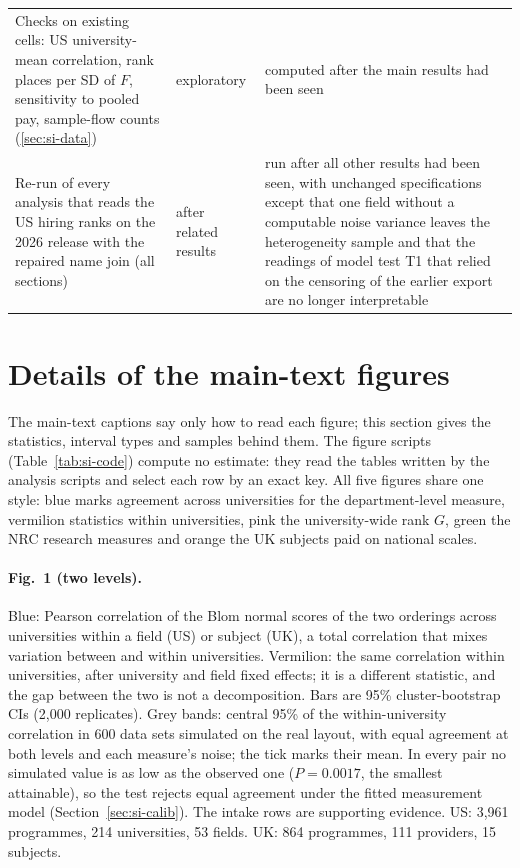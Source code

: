 \documentclass[11pt]{article}
\begin{document}
\begin{longtable}{@{}>{\raggedright\arraybackslash}p{5.6cm}>{\raggedright\arraybackslash}p{2.0cm}>{\raggedright\arraybackslash}p{8.2cm}@{}}
Checks on existing cells: US university-mean correlation, rank places per SD of $F$, sensitivity to pooled pay, sample-flow
counts (\ref{sec:si-data}) & exploratory & computed after the main results had been seen \\
Re-run of every analysis that reads the US hiring ranks on the 2026 release with the repaired name join (all
sections) & after related results & run after all other results had been seen, with unchanged specifications
except that one field without a computable noise variance leaves the heterogeneity sample and that the readings of
model test T1 that relied on the censoring of the earlier export are no longer interpretable \\
\end{longtable}
\endgroup

\section{Details of the main-text figures}\label{sec:si-figs}

The main-text captions say only how to read each figure; this section gives the statistics, interval types and
samples behind them. The figure scripts (Table~\ref{tab:si-code}) compute no estimate: they read the tables written
by the analysis scripts and select each row by an exact key. All five figures share one style: blue marks agreement across universities for the department-level measure, vermilion
statistics within universities, pink the university-wide rank $G$, green the NRC research measures and orange the UK
subjects paid on national scales.

\paragraph{Fig.~1 (two levels).} Blue: Pearson correlation of the Blom normal scores of the two orderings across
universities within a field (US) or subject (UK), a total correlation that mixes variation between and within
universities. Vermilion: the same correlation within universities, after university and field fixed effects; it is a
different statistic, and the gap between the two is not a decomposition. Bars are 95\% cluster-bootstrap CIs (2,000
replicates). Grey bands: central 95\% of the within-university correlation in 600 data sets simulated on the real
layout, with equal agreement at both levels and each measure's noise; the tick marks their mean. In every pair no
simulated value is as low as the observed one ($P=0.0017$, the smallest attainable), so the test rejects equal
agreement under the fitted measurement model (Section~\ref{sec:si-calib}). The intake rows are supporting evidence.
US: 3,961 programmes, 214 universities, 53 fields. UK: 864 programmes, 111 providers, 15 subjects.
\end{document}
